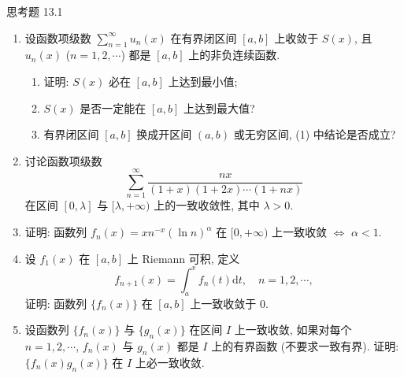 \begin{exblock}{思考题 13.1}
\begin{enumerate}
  \item 设函数项级数 $\sum_{n=1}^{\infty}u_{n}(x)$ 在有界闭区间 $[a,b]$ 上收敛于 $S(x)$, 且 $u_{n}(x)$ ($n=1,2,\cdots$) 都是 $[a,b]$ 上的非负连续函数.
  \begin{enumerate}
    \item 证明: $S(x)$ 必在 $[a,b]$ 上达到最小值;
    \item $S(x)$ 是否一定能在 $[a,b]$ 上达到最大值?
    \item 有界闭区间 $[a,b]$ 换成开区间 $(a,b)$ 或无穷区间, (1) 中结论是否成立?
  \end{enumerate}
  \item 讨论函数项级数
  \[
    \sum_{n=1}^{\infty}\frac{nx}{(1+x)(1+2x)\cdots(1+nx)}
\]
  在区间 $[0,\lambda]$ 与 $[\lambda,+\infty)$ 上的一致收敛性, 其中 $\lambda>0$.
  \item 证明: 函数列 $f_{n}(x)=xn^{-x}(\ln n)^{\alpha}$ 在 $[0,+\infty)$ 上一致收敛 $\Leftrightarrow$ $\alpha<1$.
  \item 设 $f_{1}(x)$ 在 $[a,b]$ 上 Riemann 可积, 定义
  \[
    f_{n+1}(x)=\int_{a}^{x}f_{n}(t)\mathrm{d}t,\quad n=1,2,\cdots,
\]
  证明: 函数列 $\{f_{n}(x)\}$ 在 $[a,b]$ 上一致收敛于 $0$.
  \item 设函数列 $\{f_{n}(x)\}$ 与 $\{g_{n}(x)\}$ 在区间 $I$ 上一致收敛, 如果对每个 $n=1,2,\cdots$, $f_{n}(x)$ 与 $g_{n}(x)$ 都是 $I$ 上的有界函数 (不要求一致有界). 证明: $\{f_{n}(x)g_{n}(x)\}$ 在 $I$ 上必一致收敛.


\end{enumerate}
\end{exblock}

